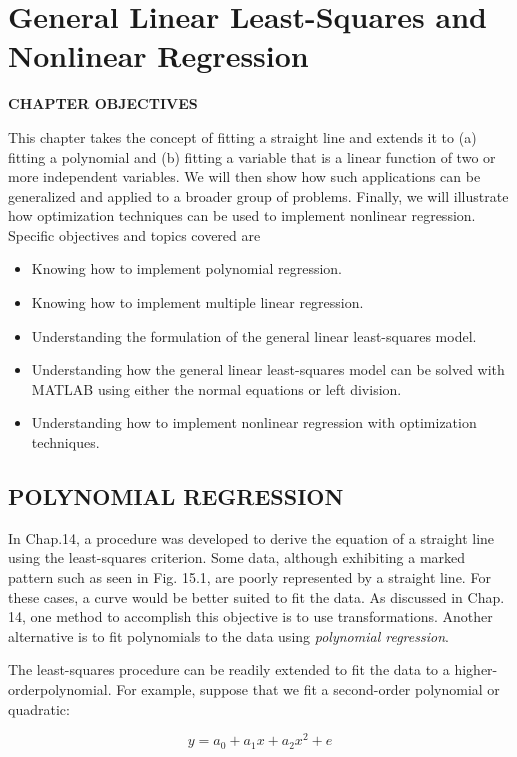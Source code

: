\documentclass[../main.tex]{subfiles}
\begin{document}
\label{cha:cha_P_15} %
\chapter{General Linear Least-Squares and Nonlinear Regression}
\textbf{CHAPTER OBJECTIVES}

\noindent This chapter takes the concept of fitting a straight line and extends it to (a) fitting a polynomial and (b) fitting a variable that is a linear function of two or more independent variables. We will then show how such applications can be generalized and applied to a broader group of problems. Finally, we will illustrate how optimization techniques can be used to implement nonlinear regression. Specific objectives and topics covered are

\begin{itemize}
	\item Knowing how to implement polynomial regression.
	\item Knowing how to implement multiple linear regression. 
	\item Understanding the formulation of the general linear least-squares model.
	\item Understanding how the general linear least-squares model can be solved with MATLAB using either the normal equations or left division.
	\item Understanding how to implement nonlinear regression with optimization techniques.
\end{itemize}


\label{cha:cha_P_15_1}
\section{POLYNOMIAL REGRESSION}
\noindent In Chap.14, a procedure was developed to derive the equation of a straight line using the least-squares criterion. Some data, although exhibiting a marked pattern such as seen in Fig. 15.1, are poorly represented by a straight line. For these cases, a curve would be better suited to fit the data. As discussed in Chap. 14, one method to accomplish this objective is to use transformations. Another alternative is to fit polynomials to the data using \emph{polynomial regression}.

The least-squares procedure can be readily extended to fit the data to a higher-orderpolynomial. For example,  suppose that we fit a second-order polynomial or quadratic:

\begin{equation}
	\tag{15.1}
	y = a_0 + a_1x + a_2x^2 + e
\end{equation}
\end{document}
